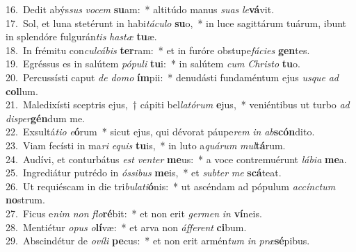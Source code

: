 {16.~}Dedit abýs\textit{sus} \textit{vo}\textit{cem} \textbf{su}am:~* altitúdo manus \textit{su}\textit{as} \textit{le}\textbf{vá}vit.\\
{17.~}Sol, et luna stetérunt in habi\textit{tá}\textit{cu}\textit{lo} \textbf{su}o,~* in luce sagittárum tuárum, ibunt in splendóre fulgurán\textit{tis} \textit{ha}\textit{stæ} \textbf{tu}æ.\\
{18.~}In frémitu con\textit{cul}\textit{cá}\textit{bis} \textbf{ter}ram:~* et in furóre obstupe\textit{fá}\textit{ci}\textit{es} \textbf{gen}tes.\\
{19.~}Egréssus es in salútem \textit{pó}\textit{pu}\textit{li} \textbf{tu}i:~* in salútem \textit{cum} \textit{Chri}\textit{sto} \textbf{tu}o.\\
{20.~}Percussísti caput \textit{de} \textit{do}\textit{mo} \textbf{ím}pii:~* denudásti fundaméntum ejus \textit{us}\textit{que} \textit{ad} \textbf{col}lum.\\
{21.~}Maledixísti sceptris ejus,~† cápiti bel\textit{la}\textit{tó}\textit{rum} \textbf{e}jus,~* veniéntibus ut turbo \textit{ad} \textit{di}\textit{sper}\textbf{gén}dum me.\\
{22.~}Exsultá\textit{ti}\textit{o} \textit{e}\textbf{ó}rum~* sicut ejus, qui dévorat páupe\textit{rem} \textit{in} \textit{ab}\textbf{scón}dito.\\
{23.~}Viam fecísti in ma\textit{ri} \textit{e}\textit{quis} \textbf{tu}is,~* in luto a\textit{quá}\textit{rum} \textit{mul}\textbf{tá}rum.\\
{24.~}Audívi, et conturbátus \textit{est} \textit{ven}\textit{ter} \textbf{me}us:~* a voce contremuérunt \textit{lá}\textit{bi}\textit{a} \textbf{me}a.\\
{25.~}Ingrediátur putrédo in \textit{ós}\textit{si}\textit{bus} \textbf{me}is,~* et \textit{sub}\textit{ter} \textit{me} \textbf{scá}teat.\\
{26.~}Ut requiéscam in die tri\textit{bu}\textit{la}\textit{ti}\textbf{ó}nis:~* ut ascéndam ad pópulum \textit{ac}\textit{cín}\textit{ctum} \textbf{no}strum.\\
{27.~}Ficus e\textit{nim} \textit{non} \textit{flo}\textbf{ré}bit:~* et non erit \textit{ger}\textit{men} \textit{in} \textbf{ví}neis.\\
{28.~}Mentiétur \textit{o}\textit{pus} \textit{o}\textbf{lí}væ:~* et arva non \textit{áf}\textit{fe}\textit{rent} \textbf{ci}bum.\\
{29.~}Abscindétur de \textit{o}\textit{ví}\textit{li} \textbf{pe}cus:~* et non erit armén\textit{tum} \textit{in} \textit{præ}\textbf{sé}pibus.\\
